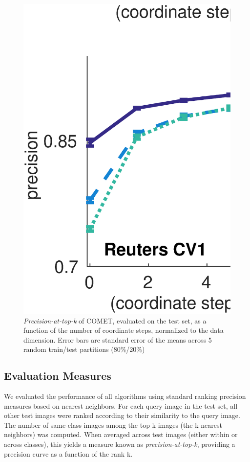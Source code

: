 \documentclass{article}
\begin{document}
\begin{figure}[t]
\vskip 0.2in
\begin{center}
\centerline{\includegraphics[width=\columnwidth]{COMET_convergence}}
\caption{ \textit{Precision-at-top-k} of COMET, evaluated on the test set, as a function of the number of coordinate steps, normalized to the data dimension. Error bars are standard error of the means across 5 random train/test partitions (80\%/20\%) }
\label{cometConvergeFig}
\end{center}
\vskip -0.2in
\end{figure} 

\subsection{Evaluation Measures}
We evaluated the performance of all algorithms using standard ranking precision measures
based on nearest neighbors. For each query image in the test set, all other test images were
ranked according to their similarity to the query image. The number of same-class images
among the top k images (the k nearest neighbors) was computed. When averaged across test
images (either within or across classes), this yields a measure known as \textit{precision-at-top-k},
providing a precision curve as a function of the rank k.
\end{document}
